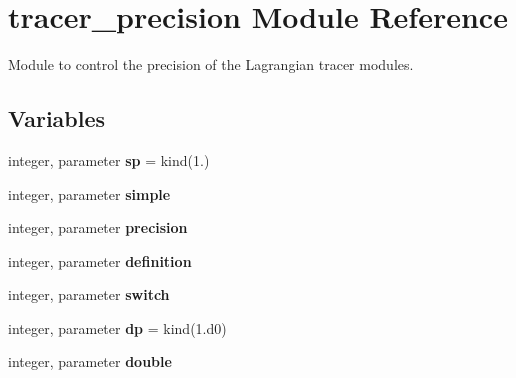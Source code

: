\hypertarget{namespacetracer__precision}{}\section{tracer\+\_\+precision Module Reference}
\label{namespacetracer__precision}


Module to control the precision of the Lagrangian tracer modules.  


\subsection*{Variables}
\begin{DoxyCompactItemize}
\item 
\mbox{\label{namespacetracer__precision_aaa3f9cb7ed44699611a16d61ca9131fb}} 
integer, parameter {\bfseries sp} = kind(1.)
\item 
\mbox{\label{namespacetracer__precision_a24ac109523ac6bdf94ede8733d20540c}} 
integer, parameter {\bfseries simple}
\item 
\mbox{\label{namespacetracer__precision_a500e0b031fcbfa6362942de8d809019c}} 
integer, parameter {\bfseries precision}
\item 
\mbox{\label{namespacetracer__precision_a6f47e4b14fb0fae0289d3e38cc609449}} 
integer, parameter {\bfseries definition}
\item 
\mbox{\label{namespacetracer__precision_a3cbb8b469b23635a541c99a352f1ade2}} 
integer, parameter {\bfseries switch}
\item 
\mbox{\label{namespacetracer__precision_a21febe1c6d584cd6b7995a7abc568efb}} 
integer, parameter {\bfseries dp} = kind(1.d0)
\item 
\mbox{\label{namespacetracer__precision_a97b2d60a124a1c2f33ba92a5af54fa3f}} 
integer, parameter {\bfseries double}
\item 
\mbox{\label{namespacetracer__precision_a360b61a43d49720ac8835b63be2a1448}} 

\end{DoxyCompactItemize}
